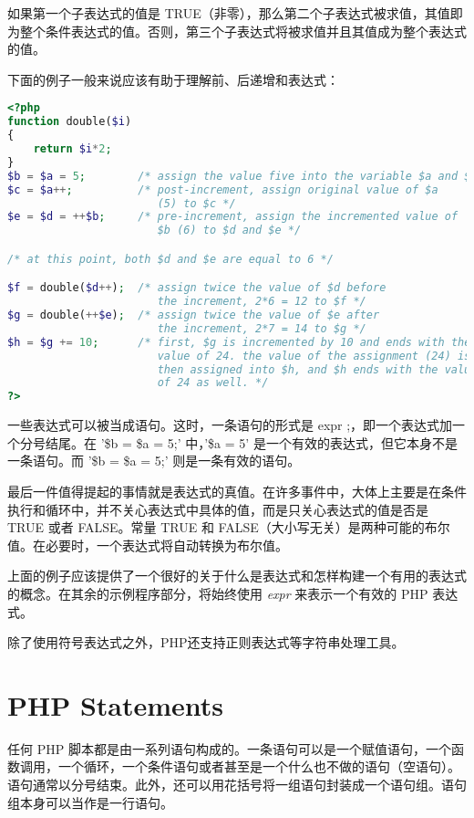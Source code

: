 如果第一个子表达式的值是 TRUE（非零），那么第二个子表达式被求值，其值即为整个条件表达式的值。否则，第三个子表达式将被求值并且其值成为整个表达式的值。

下面的例子一般来说应该有助于理解前、后递增和表达式：


\begin{lstlisting}[language=PHP]
<?php
function double($i)
{
    return $i*2;
}
$b = $a = 5;        /* assign the value five into the variable $a and $b */
$c = $a++;          /* post-increment, assign original value of $a
                       (5) to $c */
$e = $d = ++$b;     /* pre-increment, assign the incremented value of
                       $b (6) to $d and $e */

/* at this point, both $d and $e are equal to 6 */

$f = double($d++);  /* assign twice the value of $d before
                       the increment, 2*6 = 12 to $f */
$g = double(++$e);  /* assign twice the value of $e after
                       the increment, 2*7 = 14 to $g */
$h = $g += 10;      /* first, $g is incremented by 10 and ends with the
                       value of 24. the value of the assignment (24) is
                       then assigned into $h, and $h ends with the value
                       of 24 as well. */
?>
\end{lstlisting}

一些表达式可以被当成语句。这时，一条语句的形式是 expr ;，即一个表达式加一个分号结尾。在 '\$b = \$a = 5;' 中，'\$a = 5' 是一个有效的表达式，但它本身不是一条语句。而 '\$b = \$a = 5;' 则是一条有效的语句。

最后一件值得提起的事情就是表达式的真值。在许多事件中，大体上主要是在条件执行和循环中，并不关心表达式中具体的值，而是只关心表达式的值是否是 TRUE 或者 FALSE。常量 TRUE 和 FALSE（大小写无关）是两种可能的布尔值。在必要时，一个表达式将自动转换为布尔值。

上面的例子应该提供了一个很好的关于什么是表达式和怎样构建一个有用的表达式的概念。在其余的示例程序部分，将始终使用 \textsl{expr} 来表示一个有效的 PHP 表达式。

除了使用符号表达式之外，PHP还支持正则表达式等字符串处理工具。


\chapter{PHP Statements}

任何 PHP 脚本都是由一系列语句构成的。一条语句可以是一个赋值语句，一个函数调用，一个循环，一个条件语句或者甚至是一个什么也不做的语句（空语句）。语句通常以分号结束。此外，还可以用花括号将一组语句封装成一个语句组。语句组本身可以当作是一行语句。


